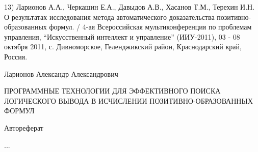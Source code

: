 \documentclass[a4paper]{report}
\begin{document}
13) Ларионов А.А., Черкашин Е.А., Давыдов А.В., Хасанов Т.М., Терехин
И.Н. О результатах исследования метода автоматического доказательства
позитивно-образованных формул. / 4-ая Всероссийская мультиконференция
по проблемам управления, ``Искусственный интеллект и управление''
(ИИУ-2011), 03 - 08 октября 2011, с. Дивноморское, Геленджикский
район, Краснодарский край, Россия.



\newpage
Ларионов Александр Александрович

ПРОГРАММНЫЕ ТЕХНОЛОГИИ ДЛЯ ЭФФЕКТИВНОГО ПОИСКА ЛОГИЧЕСКОГО ВЫВОДА В ИСЧИСЛЕНИИ ПОЗИТИВНО-ОБРАЗОВАННЫХ ФОРМУЛ

Автореферат

...

%
%
%
%
%

%

%
\end{document}
